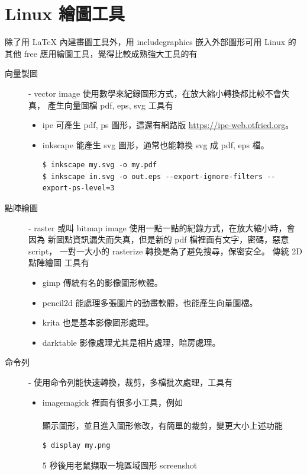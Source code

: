 \section{Linux 繪圖工具}
除了用 \LaTeX{} 內建畫圖工具外，用 includegraphics 嵌入外部圖形可用 Linux 的
其他 free 應用繪圖工具，覺得比較成熟強大工具的有
\begin{description}
  \item [向量製圖] -
    vector image 使用數學來紀錄圖形方式，在放大縮小轉換都比較不會失真，
    產生向量圖檔 pdf, eps, svg 工具有
    \begin{itemize}
      \item ipe 可產生 pdf, ps 圖形，這還有網路版
        \href{https://ipe-web.otfried.org/}{https://ipe-web.otfried.org}。
      \item inkscape 能產生 svg 圖形，通常也能轉換 svg 成 pdf, eps 檔。
        \begin{verbatim}
$ inkscape my.svg -o my.pdf
$ inkscape in.svg -o out.eps --export-ignore-filters --export-ps-level=3
        \end{verbatim}
    \end{itemize}
  \item [點陣繪圖] -
    raster 或叫 bitmap image 使用一點一點的紀錄方式，在放大縮小時，會因為
    新圖點資訊漏失而失真，但是新的 pdf 檔裡面有文字，密碼，惡意 script，
    一對一大小的 rasterize 轉換是為了避免搜尋，保密安全。 傳統 2D 點陣繪圖
    工具有
    \begin{itemize}
      \item gimp 傳統有名的影像圖形軟體。
      \item pencil2d 能處理多張圖片的動畫軟體，也能產生向量圖檔。
      \item krita 也是基本影像圖形處理。
      \item darktable 影像處理尤其是相片處理，暗房處理。
    \end{itemize}
  \item [命令列] -
    使用命令列能快速轉換，裁剪，多檔批次處理，工具有
    \begin{itemize}
      \item imagemagick 裡面有很多小工具，例如\\\\
        顯示圖形，並且進入圖形修改，有簡單的裁剪，變更大小上述功能
        \begin{verbatim}
$ display my.png
        \end{verbatim}
        5 秒後用老鼠擷取一塊區域圖形 screenshot
        \begin{verbatim}

\end{verbatim}
\end{itemize}
\end{description}
